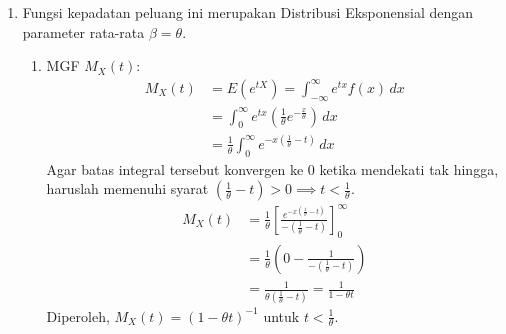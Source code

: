 \documentclass[12pt,a4paper]{article}
\begin{document}
\begin{enumerate}
  \item Fungsi kepadatan peluang ini merupakan Distribusi Eksponensial dengan parameter rata-rata $\beta = \theta$.
        \begin{enumerate}
          \item MGF $M_X(t)$:
                \begin{align*}
                  M_X(t) & = E(e^{tX}) = \int_{-\infty}^{\infty} e^{tx} f(x) \,dx                                \\
                         & = \int_{0}^{\infty} e^{tx} \left( \frac{1}{\theta} e^{-\frac{x}{\theta}} \right) \,dx \\
                         & = \frac{1}{\theta} \int_{0}^{\infty} e^{-x \left(\frac{1}{\theta} - t\right)} \,dx
                \end{align*}
                Agar batas integral tersebut konvergen ke $0$ ketika mendekati tak hingga, haruslah memenuhi syarat $\left(\frac{1}{\theta} - t\right) > 0 \implies t < \frac{1}{\theta}$.
                \begin{align*}
                  M_X(t) & = \frac{1}{\theta} \left[ \frac{e^{-x \left(\frac{1}{\theta} - t\right)}}{-\left(\frac{1}{\theta} - t\right)} \right]_{0}^{\infty} \\
                         & = \frac{1}{\theta} \left( 0 - \frac{1}{-\left(\frac{1}{\theta} - t\right)} \right)                                                 \\
                         & = \frac{1}{\theta \left(\frac{1}{\theta} - t\right)} = \frac{1}{1 - \theta t}
                \end{align*}
                Diperoleh, $M_X(t) = (1 - \theta t)^{-1}$ untuk $t < \frac{1}{\theta}$.


\end{enumerate}
\end{enumerate}
\end{document}
